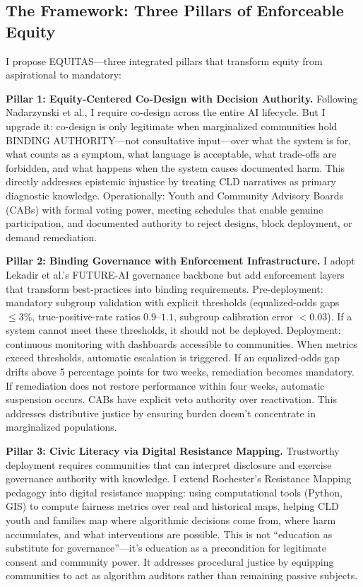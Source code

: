 \documentclass[12pt,a4paper]{article}
\begin{document}
\subsection{The Framework: Three Pillars of Enforceable Equity}

I propose EQUITAS—three integrated pillars that transform equity from aspirational to mandatory:

\textbf{Pillar 1: Equity-Centered Co-Design with Decision Authority.} Following Nadarzynski et al., I require co-design across the entire AI lifecycle.\cite{nadarzynski2024} But I upgrade it: co-design is only legitimate when marginalized communities hold BINDING AUTHORITY—not consultative input—over what the system is for, what counts as a symptom, what language is acceptable, what trade-offs are forbidden, and what happens when the system causes documented harm. This directly addresses epistemic injustice by treating CLD narratives as primary diagnostic knowledge. Operationally: Youth and Community Advisory Boards (CABs) with formal voting power, meeting schedules that enable genuine participation, and documented authority to reject designs, block deployment, or demand remediation.

\textbf{Pillar 2: Binding Governance with Enforcement Infrastructure.} I adopt Lekadir et al.'s FUTURE-AI governance backbone but add enforcement layers that transform best-practices into binding requirements.\cite{lekadir2025} Pre-deployment: mandatory subgroup validation with explicit thresholds (equalized-odds gaps $\leq 3\%$, true-positive-rate ratios $0.9$--$1.1$, subgroup calibration error $< 0.03$).\cite{chen2023} If a system cannot meet these thresholds, it should not be deployed. Deployment: continuous monitoring with dashboards accessible to communities. When metrics exceed thresholds, automatic escalation is triggered. If an equalized-odds gap drifts above 5 percentage points for two weeks, remediation becomes mandatory. If remediation does not restore performance within four weeks, automatic suspension occurs. CABs have explicit veto authority over reactivation. This addresses distributive justice by ensuring burden doesn't concentrate in marginalized populations.

\textbf{Pillar 3: Civic Literacy via Digital Resistance Mapping.} Trustworthy deployment requires communities that can interpret disclosure and exercise governance authority with knowledge. I extend Rochester's Resistance Mapping pedagogy into digital resistance mapping: using computational tools (Python, GIS) to compute fairness metrics over real and historical maps, helping CLD youth and families map where algorithmic decisions come from, where harm accumulates, and what interventions are possible. This is not ``education as substitute for governance''—it's education as a precondition for legitimate consent and community power. It addresses procedural justice by equipping communities to act as algorithm auditors rather than remaining passive subjects.
\end{document}

